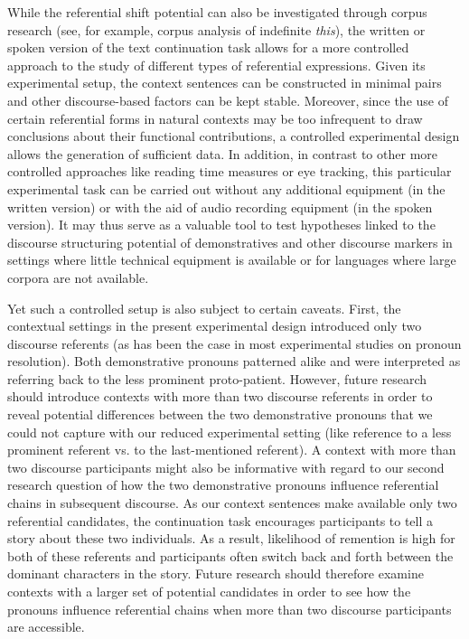 \documentclass[output=paper,colorlinks,citecolor=brown]{langscibook}
\begin{document}
While the referential shift potential can also be investigated through corpus research (see, for example,  corpus analysis of indefinite \textit{this}), the written or spoken version of the text continuation task allows for a more controlled approach to the study of different types of referential expressions. Given its experimental setup, the context sentences can be constructed in minimal pairs and other discourse-based factors can be kept stable. Moreover, since the use of certain referential forms in natural contexts may be too infrequent to draw conclusions about their functional contributions, a controlled experimental design allows the generation of sufficient data. In addition, in contrast to other more controlled approaches like reading time measures or eye tracking, this particular experimental task can be carried out without any additional equipment (in the written version) or with the aid of audio recording equipment (in the spoken version). It may thus serve as a valuable tool to test hypotheses linked to the discourse structuring potential of demonstratives and other discourse markers in settings where little technical equipment is available or for languages where large corpora are not available. 

Yet such a controlled setup is also subject to certain caveats. First, the contextual settings in the present experimental design introduced only two discourse referents (as has been the case in most experimental studies on pronoun resolution). Both demonstrative pronouns patterned alike and were interpreted as referring back to the less prominent proto-patient. However, future research should introduce contexts with more than two discourse referents in order to reveal potential differences between the two demonstrative pronouns that we could not capture with our reduced experimental setting (like reference to a less prominent referent vs. to the last-mentioned referent). A context with more than two discourse participants might also be informative with regard to our second research question of how the two demonstrative pronouns influence referential chains in subsequent discourse. As our context sentences make available only two referential candidates, the continuation task encourages participants to tell a story about these two individuals. As a result, likelihood of remention is high for both of these referents and participants often switch back and forth between the dominant characters in the story. Future research should therefore examine contexts with a larger set of potential candidates in order to see how the pronouns influence referential chains when more than two discourse participants are accessible. 
\end{document}
